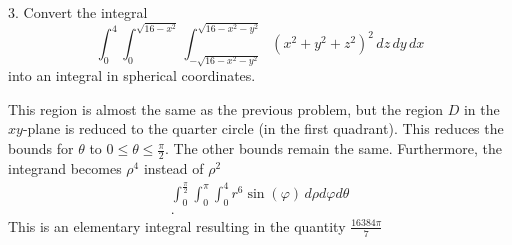 \documentclass{report}
\begin{document}
    \bigbreak \noindent 
    \begin{mdframed}
        3. Convert the integral
        \[
        \int_{0}^{4} \int_{0}^{\sqrt{16-x^2}} \int_{-\sqrt{16-x^2-y^2}}^{\sqrt{16-x^2-y^2}} \left( x^2 + y^2 + z^2 \right)^2 \,dz\,dy\,dx
        \]
        into an integral in spherical coordinates.
    \end{mdframed}
    \bigbreak \noindent 
    This region is almost the same as the previous problem, but the region $D$ in the $xy$-plane is reduced to the quarter circle (in the first quadrant). This reduces the bounds for $\theta$ to $0 \leq \theta  \leq\frac{\pi}{2}$. The other bounds remain the same. Furthermore, the integrand becomes $\rho^{4}$ instead of $\rho^{2}$
    \begin{align*}
        \int_{0}^{\frac{\pi}{2 }}\int_{0}^{\pi }\int_{0}^{4} r^{6}\sin{\left(\varphi\right)} \, d\rho d\varphi d\theta  \\
    .\end{align*}
    This is an elementary integral resulting in the quantity $\frac{16384\pi}{7} $
\end{document}
